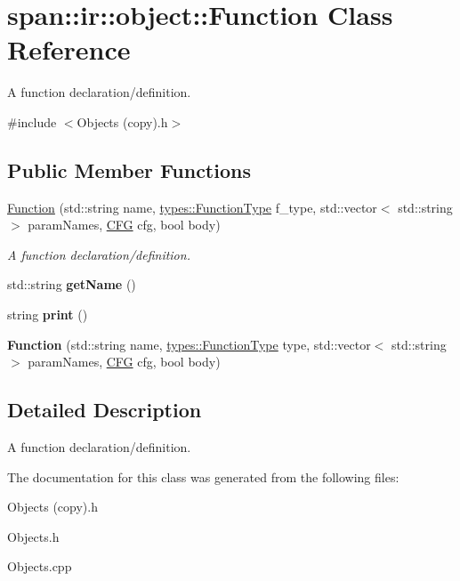 \hypertarget{classspan_1_1ir_1_1object_1_1Function}{}\section{span\+:\+:ir\+:\+:object\+:\+:Function Class Reference}
\label{classspan_1_1ir_1_1object_1_1Function}


A function declaration/definition.  




{\ttfamily \#include $<$Objects (copy).\+h$>$}

\subsection*{Public Member Functions}
\begin{DoxyCompactItemize}
\item 
\mbox{\label{classspan_1_1ir_1_1object_1_1Function_a4a1a00a0c3feff4a0991b32bc580fb0f}} 
\hyperlink{classspan_1_1ir_1_1object_1_1Function_a4a1a00a0c3feff4a0991b32bc580fb0f}{Function} (std\+::string name, \hyperlink{classspan_1_1ir_1_1types_1_1FunctionType}{types\+::\+Function\+Type} f\+\_\+type, std\+::vector$<$ std\+::string $>$ param\+Names, \hyperlink{classspan_1_1ir_1_1object_1_1CFG}{C\+FG} cfg, bool body)
\begin{DoxyCompactList}\small\item\em A function declaration/definition. \end{DoxyCompactList}\item 
\mbox{\label{classspan_1_1ir_1_1object_1_1Function_a5b7d859d767e8a9c19fc5b81a0d10395}} 
std\+::string {\bfseries get\+Name} ()
\item 
\mbox{\label{classspan_1_1ir_1_1object_1_1Function_a9afe1cb929167902a8f8b13f02e76ed0}} 
string {\bfseries print} ()
\item 
\mbox{\label{classspan_1_1ir_1_1object_1_1Function_accfbeb9590ab36f197257aa475a64e6f}} 
{\bfseries Function} (std\+::string name, \hyperlink{classspan_1_1ir_1_1types_1_1FunctionType}{types\+::\+Function\+Type} type, std\+::vector$<$ std\+::string $>$ param\+Names, \hyperlink{classspan_1_1ir_1_1object_1_1CFG}{C\+FG} cfg, bool body)
\end{DoxyCompactItemize}


\subsection{Detailed Description}
A function declaration/definition. 

The documentation for this class was generated from the following files\+:\begin{DoxyCompactItemize}
\item 
Objects (copy).\+h\item 
Objects.\+h\item 
Objects.\+cpp\end{DoxyCompactItemize}
